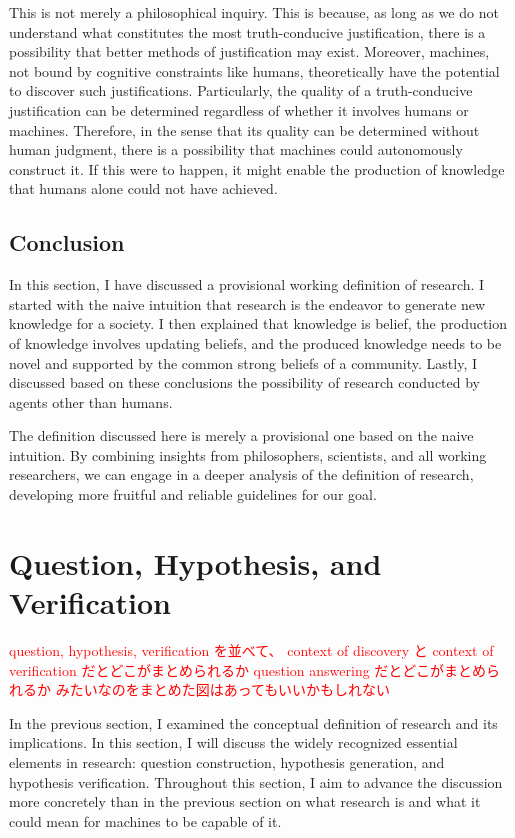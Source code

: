This is not merely a philosophical inquiry. This is because, as long as we do not understand what constitutes the most truth-conducive justification, there is a possibility that better methods of justification may exist. Moreover, machines, not bound by cognitive constraints like humans, theoretically have the potential to discover such justifications. Particularly, the quality of a truth-conducive justification can be determined regardless of whether it involves humans or machines. Therefore, in the sense that its quality can be determined without human judgment, there is a possibility that machines could autonomously construct it. If this were to happen, it might enable the production of knowledge that humans alone could not have achieved.

\subsection{Conclusion}
In this section, I have discussed a provisional working definition of research. I started with the naive intuition that research is the endeavor to generate new knowledge for a society. I then explained that knowledge is belief, the production of knowledge involves updating beliefs, and the produced knowledge needs to be novel and supported by the common strong beliefs of a community. Lastly, I discussed based on these conclusions the possibility of research conducted by agents other than humans.

The definition discussed here is merely a provisional one based on the naive intuition. By combining insights from philosophers, scientists, and all working researchers, we can engage in a deeper analysis of the definition of research, developing more fruitful and reliable guidelines for our goal.

\section{Question, Hypothesis, and  Verification}
\textcolor{red}{question, hypothesis, verification を並べて、
context of discovery と context of verification だとどこがまとめられるか
question answering だとどこがまとめられるか
みたいなのをまとめた図はあってもいいかもしれない}

In the previous section, I examined the conceptual definition of research and its implications. In this section, I will discuss the widely recognized essential elements in research: question construction, hypothesis generation, and hypothesis verification. Throughout this section, I aim to advance the discussion more concretely than in the previous section on what research is and what it could mean for machines to be capable of it.

